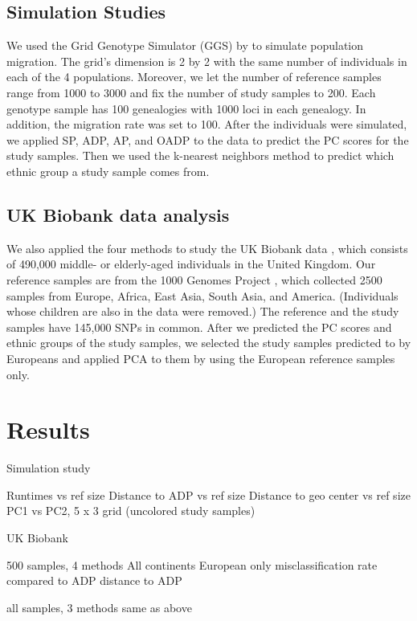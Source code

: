 \documentclass{article}
\begin{document}
\subsection{Simulation Studies}

We used the Grid Genotype Simulator (GGS)
by \citet{ mathieson2012differential}
to simulate population migration.
The grid's dimension is 2 by 2
with the same number of individuals
in each of the 4 populations.
Moreover, we let the number of reference samples
range from 1000 to 3000
and fix the number of study samples to 200.
Each genotype sample has 100 genealogies
with 1000 loci in each genealogy.
In addition, the migration rate was set to 100.
After the individuals were simulated,
we applied SP, ADP, AP, and OADP to the data
to predict the PC scores for the study samples.
Then we used the k-nearest neighbors method
to predict which ethnic group a study sample comes from.

\subsection{UK Biobank data analysis}

We also applied the four methods
to study the UK Biobank data \citep{sudlow2015uk},
which consists of 490,000 middle- or elderly-aged individuals
in the United Kingdom.
Our reference samples
are from the 1000 Genomes Project \citep{10002015global},
which collected 2500 samples from Europe, Africa, East Asia, South Asia, and America.
(Individuals whose children are also in the data were removed.)
The reference and the study samples
have 145,000 SNPs in common.
After we predicted the PC scores and ethnic groups
of the study samples,
we selected the study samples predicted to by Europeans
and applied PCA to them
by using the European reference samples only.


\section{Results}

Simulation study

Runtimes vs ref size
Distance to ADP vs ref size
Distance to geo center vs ref size
PC1 vs PC2, 5 x 3 grid (uncolored study samples)

UK Biobank

500 samples, 4 methods
All continents
European only
misclassification rate compared to ADP
distance to ADP

all samples, 3 methods
same as above
\end{document}
